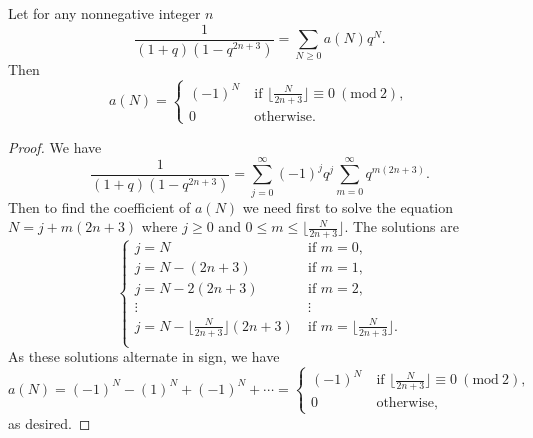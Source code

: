 \documentclass[10pt,a4paper]{amsart}
\newcommand{\Mod}[1]{\ (\mathrm{mod}\ #1)}
\newcommand{\fr}{\frac}
\begin{document}
\begin{lemma}\label{lem-1 C23}
Let for any nonnegative integer $n$
\[
\fr{1}{(1+q)(1-q^{2n+3})} = \sum_{N\geq 0} a(N) q^N.
\]
Then
\[
a(N) = \begin{cases}
(-1)^N &\ \text{if\ } \lfloor \fr{N}{2n+3} \rfloor \equiv 0\Mod{2}, \\
0 &\ \text{otherwise.}
\end{cases}
\]
\end{lemma}

\begin{proof}
We have
\[
\fr{1}{(1+q)(1-q^{2n+3})}= \sum_{j=0}^\infty (-1)^j q^j \sum_{m=0}^\infty q^{m(2n+3)}.
\]
Then to find the coefficient of $a(N)$ we need first to solve the equation
$N=j+m(2n+3)$ where $j\geq 0$ and $0\leq m \leq \lfloor \fr{N}{2n+3}\rfloor$.
The solutions are
\[
\begin{cases}
j= N &\ \text{if $m=0$}, \\
j=N-(2n+3) &\ \text{if $m=1$}, \\
j=N-2(2n+3) &\ \text{if $m=2$}, \\
\vdots &\ \vdots \\
j=N- \lfloor \fr{N}{2n+3}\rfloor (2n+3) &\ \text{if $m= \lfloor \fr{N}{2n+3}\rfloor$}. \\
\end{cases}
\]
As these solutions alternate in sign, we have
\[
a(N)= (-1)^N - (1)^N + (-1)^N +\cdots
= \begin{cases}
(-1)^N &\ \text{if\ } \lfloor \fr{N}{2n+3} \rfloor \equiv 0\Mod{2}, \\
0 &\ \text{otherwise,}
\end{cases}
\]
as desired.
\end{proof}
\end{document}
